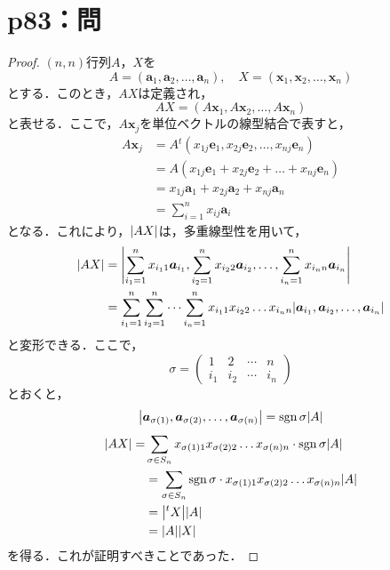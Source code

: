 \documentclass[a4paper,10pt,fleqn]{ltjsarticle}
\begin{document}
\newpage

\section*{p83：問}

\begin{leftbar}
    \begin{proof}
        $(n,n)$行列$A$，$X$を
        \[
            A = (\bm{a}_1 ,\bm{a}_2, \dots ,\bm{a}_n) , \quad X = (\bm{x}_1,\bm{x}_2,\dots,\bm{x}_n)
        \]
        とする．このとき，$AX$は定義され，
        \[
            AX = (A\bm{x}_1 , A\bm{x}_2 , \dots ,A\bm{x}_n)
        \]
        と表せる．ここで，$A \bm{x}_j$を単位ベクトルの線型結合で表すと，
        \begin{align*}
            A \bm{x}_j & = A {}^t (x_{1j} \bm{e}_1 , x_{2j} \bm{e}_2,\ldots ,x_{nj} \bm{e}_n ) \\
                       & =A (x_{1j} \bm{e}_1 + x_{2j} \bm{e}_2+ \dots + x_{nj} \bm{e}_n)       \\
                       & = x_{1j} \bm{a}_1 + x_{2j} \bm{a}_2 + x_{nj} \bm{a}_n                 \\
                       & = \sum_{ i =1}^{n} x_{ij} \bm{a}_{i}
        \end{align*}
        となる．これにより，$\abs{AX}$は，多重線型性を用いて，
        \begin{align*}
            \abs{AX} & = \abs{\sum_{i_1 =1}^{n} x_{i_1 1} \bm{a}_{i_1} , \sum_{i_2 =1}^{n} x_{i_2 2} \bm{a}_{i_2},\ldots , \sum_{i_n =1}^{n} x_{i_n n} \bm{a}_{i_n} }        \\
                     & = \sum_{i_1 =1}^{n} \sum_{i_2 = 1}^{n} \dots \sum_{i_n =1}^{n} x_{i_1 1} x_{i_2 2} \dots x_{i_n n} \abs{\bm{a}_{i_1},\bm{a}_{i_2},\dots,\bm{a}_{i_n}}
        \end{align*}
        と変形できる．ここで，
        \[
            \sigma = \begin{pmatrix} 1 & 2 & \cdots & n \\ i_1 & i_2 & \cdots & i_n \end{pmatrix}
        \]
        とおくと，
        \[
            \abs{\bm{a}_{\sigma (1)},\bm{a}_{\sigma(2)},\dots,\bm{a}_{\sigma(n)}} = \operatorname{sgn} \sigma \abs{A}
        \]
        \begin{align*}
            \abs{AX} = & \sum_{\sigma \in S_n} x_{\sigma (1)1} x_{\sigma(2)2} \dots x_{\sigma(n)n} \cdot \operatorname{sgn} \sigma  \abs{A}   \\
                       & = \sum_{\sigma \in S_n } \operatorname{sgn} \sigma \cdot x_{\sigma(1)1} x_{\sigma(2)2} \dots x_{\sigma (n)n} \abs{A} \\
                       & = \abs{{}^t X} \abs{A}                                                                                 \\
                       & = \abs{A} \abs{X}
        \end{align*}
        を得る．これが証明すべきことであった．
    \end{proof}
\end{leftbar}
\end{document}
